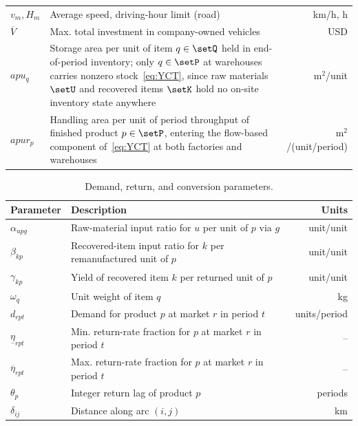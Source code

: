 \begin{table}[htbp]
\begin{tabularx}{\textwidth}{@{}lXr@{}}
$v_m,H_m$ & Average speed, driving-hour limit (road) & km/h, h \\
$\overline{V}$ & Max. total investment in company-owned vehicles & USD \\
$apu_q$ & Storage area per unit of item $q\in\setQ$ held in end-of-period inventory; only $q\in\setP$ at warehouses carries nonzero stock~\eqref{eq:YCT}, since raw materials $\setU$ and recovered items $\setK$ hold no on-site inventory state anywhere & m$^2$/unit \\
$apur_p$ & Handling area per unit of period throughput of finished product $p\in\setP$, entering the flow-based component of~\eqref{eq:YCT} at both factories and warehouses & m$^2$/(unit/period) \\
\bottomrule
\end{tabularx}
\end{table}

\begin{table}[htbp]
\centering
\caption{Demand, return, and conversion parameters.}
\label{tab:demand_params}
\footnotesize
\renewcommand{\arraystretch}{1.15}
\begin{tabular}{@{}llr@{}}
\toprule
Parameter & Description & Units \\
\midrule
$\alpha_{upg}$ & Raw-material input ratio for $u$ per unit of $p$ via $g$ & unit/unit \\
$\beta_{kp}$ & Recovered-item input ratio for $k$ per remanufactured unit of $p$ & unit/unit \\
$\gamma_{kp}$ & Yield of recovered item $k$ per returned unit of $p$ & unit/unit \\
$\omega_q$ & Unit weight of item $q$ & kg \\
$d_{rpt}$ & Demand for product $p$ at market $r$ in period $t$ & units/period \\
$\underline{\eta}_{rpt}$ & Min. return-rate fraction for $p$ at market $r$ in period $t$ & -- \\
$\overline{\eta}_{rpt}$ & Max. return-rate fraction for $p$ at market $r$ in period $t$ & -- \\
$\theta_p$ & Integer return lag of product $p$ & periods \\
$\delta_{ij}$ & Distance along arc $(i,j)$ & km \\
\bottomrule
\end{tabular}
\end{table}

